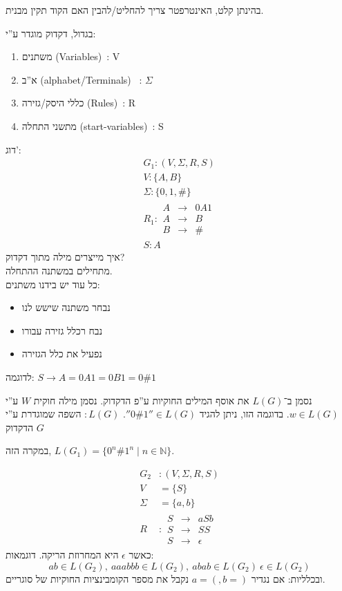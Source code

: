 \documentclass[]{article}
\newcommand\del   {$ \!\! $}
\newcommand\N     {\mathbb{N}}
\newcommand\Si    {\Sigma}
\newcommand\epsi  {\epsilon}
\begin{document}
	בהינתן קלט, האינטרפטר צריך להחליט/להבין האם הקוד תקין מבנית. 
	
	בגדול, דקדוק מוגדר ע''י: 
	\begin{enumerate}
		\item משתנים (Variables)\del \ : V
		\item א''ב (alphabet/Terminals) \del\ : $\Sigma$
		\item כללי היסק/גזירה (Rules)\del \ : R
		\item מתשני התחלה (start-variables)\del \ : S
	\end{enumerate}
	דוג': 
	\begin{gather*}
		G_1 \colon (V, \Sigma, R, S) \\
		V \colon \{A, B\} \\
		\Si \colon  \{0, 1, \#\} \\
		R_1: \begin{matrix}
			A &\to &0A1\\
			A &\to &B \\
			B &\to &\#
		\end{matrix} \\
		S \colon A
	\end{gather*}
	איך מייצרים מילה מתוך דקדוק? \\
	מתחילים במשתנה ההתחלה. \\
	כל עוד יש בידנו משתנים: 
	\begin{itemize}[-]
		\item נבחר משתנה שישש לנו
		\item נבח רכלל גזירה עבורו
		\item נפעיל את כלל הגזירה
	\end{itemize}
	לדוגמה: 
	$S \to A = 0A1 = 0B1 = 0\#1 $
	
	נסמן ב־$L(G)$ את אוסף המילים החוקיות ע''פ הדקדוק. נסמן מילה חוקית $W$ ע''י $w \in L(G)$. בדוגמה הזו, ניתן להגיד $''0\#1'' \in L(G)$. 
	$:L(G)$ השפה שמוגדרת ע''י הדקדוק $G$
	
	במקרה הזה, $L(G_1) = \{0^n\#1^n \mid n \in \N\}$. 
	
	\begin{align}
		G_2 &\colon (V, \Si, R, S)\\
		V &= \{S\} \\
		\Si &= \{a, b\} \\
		R &\colon \begin{matrix}
			S &\to &aSb \\
			S &\to &SS \\
			S & \to &\epsi
		\end{matrix}
	\end{align}
	כאשר $\epsi$ היא המחרוזת הריקה. 
	דוגמאות: 
	\[ ab \in L(G_2), \ aaabbb \in L(G_2), \ abab \in L(G_2) \ \epsi \in L(G_2) \]
	ובכלליות: אם נגדיר $a = (, b = )$ נקבל את מספר הקומבינציות החוקיות של סוגריים. 
	
\end{document}
